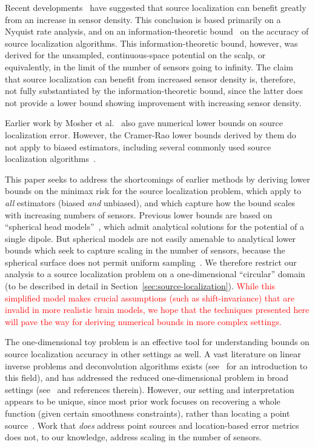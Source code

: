 \documentclass[conference,letterpaper]{IEEEtran}
\begin{document}
Recent developments~\cite{Grover2016Information} have suggested that source
localization can benefit greatly from an increase in sensor density. This
conclusion is based primarily on a Nyquist rate analysis, and on an
information-theoretic bound~\cite{Grover2016Fundamental} on the accuracy of
source localization algorithms. This information-theoretic bound, however, was
derived for the unsampled, continuous-space potential on the scalp, or
equivalently, in the limit of the number of sensors going to infinity. The
claim that source localization can benefit from increased sensor density is,
therefore, not fully substantiated by the information-theoretic bound, since
the latter does not provide a lower bound showing improvement with increasing
sensor density.

Earlier work by Mosher et al.~\cite{Mosher1993Error} also gave numerical lower
bounds on source localization error. However, the Cramer-Rao lower bounds
derived by them do not apply to biased estimators, including several commonly
used source localization
algorithms~\cite{Hamalainen1994Interpreting,Lin2006Assessing}.

This paper seeks to address the shortcomings of earlier methods by deriving
lower bounds on the minimax risk for the source localization problem, which
apply to \emph{all} estimators (biased \emph{and} unbiased), and which capture
how the bound scales with increasing numbers of sensors. Previous lower bounds
are based on ``spherical head
models''~\cite{Nunez2006Electric,Grover2016Information}, which admit analytical
solutions for the potential of a single dipole. But spherical models are not
easily amenable to analytical lower bounds which seek to capture scaling in the
number of sensors, because the spherical surface does not permit uniform
sampling~\cite{Heath1956Thirteen}. We therefore restrict our analysis to a
source localization problem on a one-dimensional ``circular'' domain (to be
described in detail in Section~\ref{sec:source-localization}).
\textcolor{red}{While this simplified model makes crucial assumptions (such as
	shift-invariance) that are invalid in more realistic brain models, we hope
	that the techniques presented here will pave the way for deriving numerical
	bounds in more complex settings.}

The one-dimensional toy problem is an effective tool for understanding bounds
on source localization accuracy in other settings as well. A vast literature on
linear inverse problems and deconvolution algorithms exists
(see~\cite{Bal2012Introduction} for an introduction to this field), and has
addressed the reduced one-dimensional problem in broad settings
(see~\cite{Cavalier2002Sharp,Efromovich1997Robust,Ibragimov1981Statistical} and
references therein). However, our setting and interpretation appears to be
unique, since most prior work focuses on recovering a whole function (given
certain smoothness constraints), rather than locating a point
source~\cite{Cavalier2002Sharp}. Work that \emph{does} address point sources
and location-based error metrics~\cite[Ch.~7, Sec.~2]{Ibragimov1981Statistical}
does not, to our knowledge, address scaling in the number of sensors.
\end{document}
